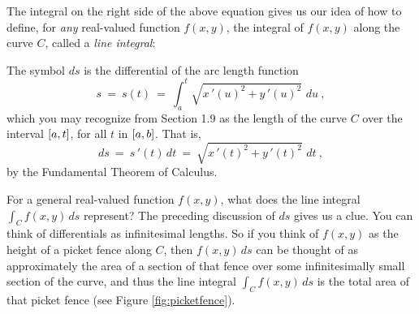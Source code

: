 The integral on the right side of the above equation gives us our idea of how to define, for \emph{any}
real-valued function $f(x,y)$, the integral of $f(x,y)$ along the curve $C$, called a \emph{line integral}:


The symbol $ds$ is the differential of the arc length function
\begin{equation}\label{eqn:arclen2}
 s ~=~ s(t) ~=~ \int_a^t \sqrt{x\,'(u)^2 + y\,'(u)^2}\,\,du ~,
\end{equation}
which you may recognize from Section 1.9 as the length of the curve $C$ over the interval $\lbrack a,t \rbrack$, for all
$t$ in $\lbrack a,b \rbrack$. That is,
\begin{equation}
 ds ~=~ s\,'(t)\,dt ~=~ \sqrt{x\,'(t)^2 + y\,'(t)^2}\,\,dt ~,
\end{equation}
by the Fundamental Theorem of Calculus.

For a general real-valued function $f(x,y)$, what does the line integral $\int_C f(x,y)\,ds$ represent? The preceding
discussion of $ds$ gives us a clue. You can think of differentials as infinitesimal lengths. So if you think
of $f(x,y)$ as the height of a picket fence along $C$, then $f(x,y)\,ds$ can be thought of as approximately the area of
a section of that fence over some infinitesimally small section of the curve, and thus the line integral
$\int_C f(x,y)\,ds$ is the total area of that picket fence (see Figure \ref{fig:picketfence}).

